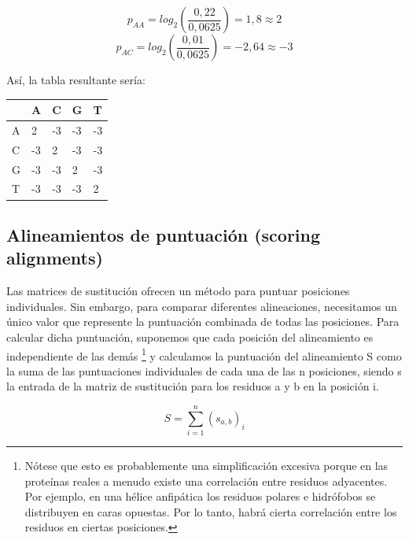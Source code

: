 $$p_{AA} = log_2(\frac{0,22}{0,0625}) = 1,8 \approx 2$$
$$p_{AC} = log_2(\frac{0,01}{0,0625}) = -2,64 \approx -3$$

Así, la tabla resultante sería:

\begin{table}[htbp]
    \centering
    \begin{tabularx}{\textwidth}{ X | X X X X}
          & A & C & G & T \\ \hline
         A & 2 & -3 & -3 & -3 \\
         C & -3 & 2& -3 & -3 \\
         G & -3 & -3 & 2 & -3 \\
         T & -3 & -3 & -3 & 2 \\
    \end{tabularx}
\end{table}

\subsection{Alineamientos de puntuación (scoring alignments)}
Las matrices de sustitución ofrecen un método para puntuar posiciones individuales. Sin embargo, para comparar diferentes alineaciones, necesitamos un único valor que represente la puntuación combinada de todas las posiciones. Para calcular dicha puntuación, suponemos que cada posición del alineamiento es independiente de las demás \footnote{Nótese que esto es probablemente una simplificación excesiva porque en las proteínas reales a menudo existe una correlación entre residuos adyacentes. Por ejemplo, en una hélice anfipática los residuos polares e hidrófobos se distribuyen en caras opuestas. Por lo tanto, habrá cierta correlación entre los residuos en ciertas posiciones.} y calculamos la puntuación del alineamiento S como la suma de las puntuaciones individuales de cada una de las n posiciones, siendo s la entrada de la matriz de sustitución para los residuos a y b en la posición i.

$$S = \sum_{i = 1}^{n} (s_{a,b})_i$$

